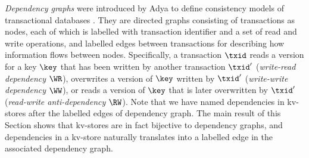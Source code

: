 \emph{Dependency graphs} were introduced by Adya to define consistency models of transactional databases \cite{adya}. 
They are directed graphs consisting of transactions as nodes, 
each of which is labelled with transaction identifier and a set of read and write operations,
and labelled edges between transactions for describing how information flows between nodes. 
Specifically, a transaction $\txid$ reads a version for a key $\key$ that has been written by another transaction $\txid'$ 
(\emph{write-read dependency} \( \WR\)), overwrites a version of $\key$ written by $\txid'$ (\emph{write-write dependency} \( \WW \)),
or reads a version of $\key$ that is later overwritten by $\txid'$ (\emph{read-write anti-dependency} \( \RW \)). 
Note that we have named dependencies in kv-stores after the labelled edges of dependency graph. 
The main result of this Section shows that kv-stores are in fact bijective to dependency graphs, 
and dependencies in a kv-store naturally translates into a labelled edge in the associated dependency graph.

